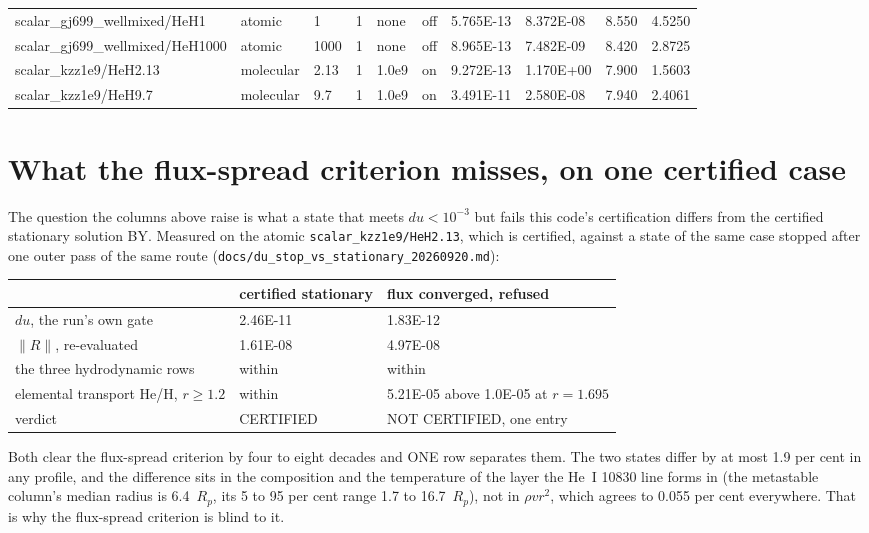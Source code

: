 \documentclass[11pt]{my_memo}
\begin{document}
\begin{longtable}{@{}l >{\raggedright\arraybackslash}p{1.5cm} l l l l l l r r@{}}
scalar\_gj699\_wellmixed/HeH1 & atomic & 1 & 1 & none & off & 5.765E-13 & 8.372E-08 & 8.550 & 4.5250\\
scalar\_gj699\_wellmixed/HeH1000 & atomic & 1000 & 1 & none & off & 8.965E-13 & 7.482E-09 & 8.420 & 2.8725\\
scalar\_kzz1e9/HeH2.13 & molecular & 2.13 & 1 & 1.0e9 & on & 9.272E-13 & 1.170E+00 & 7.900 & 1.5603\\
scalar\_kzz1e9/HeH9.7 & molecular & 9.7 & 1 & 1.0e9 & on & 3.491E-11 & 2.580E-08 & 7.940 & 2.4061\\
\bottomrule
\end{longtable}\normalsize

\section{What the flux-spread criterion misses, on one certified case}

The question the columns above raise is what a state that meets $du < 10^{-3}$
but fails this code's certification differs from the certified stationary
solution BY. Measured on the atomic \texttt{scalar\_kzz1e9/HeH2.13}, which is certified,
against a state of the same case stopped after one outer pass of the same
route (\texttt{docs/du\_stop\_vs\_stationary\_20260920.md}):

\begin{center}
\footnotesize
\begin{tabular}{@{}l l l@{}}
\toprule
 & certified stationary & flux converged, refused\\
\midrule
$du$, the run's own gate & 2.46E-11 & 1.83E-12\\
$\lVert R\rVert$, re-evaluated & 1.61E-08 & 4.97E-08\\
the three hydrodynamic rows & within & within\\
elemental transport He/H, $r \ge 1.2$ & within & 5.21E-05 above 1.0E-05 at $r = 1.695$\\
verdict & CERTIFIED & NOT CERTIFIED, one entry\\
\bottomrule
\end{tabular}
\end{center}

\noindent
Both clear the flux-spread criterion by four to eight decades and ONE row
separates them. The two states differ by at most 1.9 per cent in any profile,
and the difference sits in the composition and the temperature of the layer
the He~I 10830 line forms in (the metastable column's median radius is
6.4~$R_p$, its 5 to 95 per cent range 1.7 to 16.7~$R_p$), not in
$\rho v r^2$, which agrees to 0.055 per cent everywhere. That is why the
flux-spread criterion is blind to it.
\end{document}
